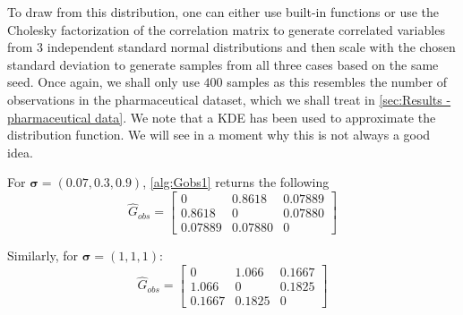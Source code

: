 \documentclass[../Thesis.tex]{subfiles}
\begin{document}

To draw from this distribution, one can either use built-in functions or use the Cholesky factorization of the correlation matrix to generate correlated variables from $3$ independent standard normal distributions and then scale with the chosen standard deviation to generate samples from all three cases based on the same seed. Once again, we shall only use $400$ samples as this resembles the number of observations in the pharmaceutical dataset, which we shall treat in \autoref{sec:Results - pharmaceutical data}. We note that a KDE has been used to approximate the distribution function. We will see in a moment why this is not always a good idea.


For $\boldsymbol\sigma = (0.07, 0.3, 0.9)$, \autoref{alg:Gobs1} returns the following
\begin{equation} \label{eq:s small G_dir}
    \hat{G}_{obs} =
    \begin{bmatrix}
        0       & 0.8618  & 0.07889 \\
        0.8618  & 0       & 0.07880 \\
        0.07889 & 0.07880 & 0
    \end{bmatrix}
\end{equation}


Similarly, for $\boldsymbol\sigma = (1,1,1)$:
\begin{equation} \label{eq:s medium G_dir}
    \hat{G}_{obs} =
    \begin{bmatrix}
        0      & 1.066  & 0.1667 \\
        1.066  & 0      & 0.1825 \\
        0.1667 & 0.1825 & 0
    \end{bmatrix}
\end{equation}
\end{document}
